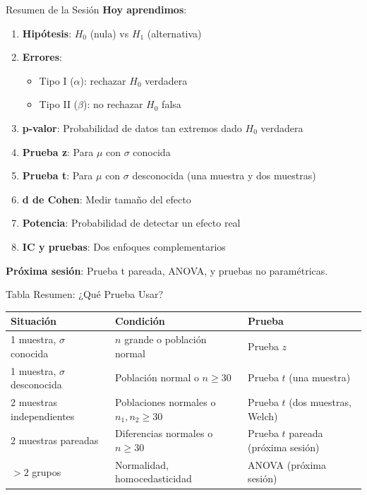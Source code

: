 \documentclass[aspectratio=169, 11pt]{beamer}
\begin{document}
\begin{frame}{Resumen de la Sesión}
\textbf{Hoy aprendimos}:
\begin{enumerate}
  \item \textbf{Hipótesis}: $H_0$ (nula) vs $H_1$ (alternativa)
  \item \textbf{Errores}:
  \begin{itemize}
    \item Tipo I ($\alpha$): rechazar $H_0$ verdadera
    \item Tipo II ($\beta$): no rechazar $H_0$ falsa
  \end{itemize}
  \item \textbf{p-valor}: Probabilidad de datos tan extremos dado $H_0$ verdadera
  \item \textbf{Prueba z}: Para $\mu$ con $\sigma$ conocida
  \item \textbf{Prueba t}: Para $\mu$ con $\sigma$ desconocida (una muestra y dos muestras)
  \item \textbf{d de Cohen}: Medir tamaño del efecto
  \item \textbf{Potencia}: Probabilidad de detectar un efecto real
  \item \textbf{IC y pruebas}: Dos enfoques complementarios
\end{enumerate}

\vspace{0.3cm}
\textbf{Próxima sesión}: Prueba t pareada, ANOVA, y pruebas no paramétricas.
\end{frame}

\begin{frame}{Tabla Resumen: ¿Qué Prueba Usar?}
\begin{table}
\centering
\footnotesize
\begin{tabular}{p{3cm}p{2.5cm}p{4cm}}
\toprule
\textbf{Situación} & \textbf{Condición} & \textbf{Prueba} \\
\midrule
1 muestra, $\sigma$ conocida & $n$ grande o población normal & Prueba $z$ \\[0.2cm]
1 muestra, $\sigma$ desconocida & Población normal o $n \geq 30$ & Prueba $t$ (una muestra) \\[0.2cm]
2 muestras independientes & Poblaciones normales o $n_1, n_2 \geq 30$ & Prueba $t$ (dos muestras, Welch) \\[0.2cm]
2 muestras pareadas & Diferencias normales o $n \geq 30$ & Prueba $t$ pareada (próxima sesión) \\[0.2cm]
$> 2$ grupos & Normalidad, homocedasticidad & ANOVA (próxima sesión) \\
\bottomrule
\end{tabular}
\end{table}
\end{frame}
\end{document}
